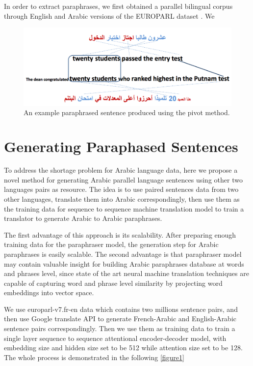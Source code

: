\documentclass[11pt,letterpaper]{article}
\begin{document}
In order to extract paraphrases, we first obtained a parallel bilingual corpus through English and Arabic versions of the EUROPARL dataset \cite{Koehn_europarl}. We 
\begin{figure}
\includegraphics[scale=0.5]{arabic_pivot}
\caption{An example paraphrased sentence produced using the pivot method. }
\end{figure}
\section{Generating Paraphased Sentences}
	To address the shortage problem for Arabic language data, here we propose a novel method for generating Arabic parallel language sentences using other two languages pairs as resource. The idea is to use paired sentences data from two other languages, translate them into Arabic correspondingly, then use them as the  training data for sequence to sequence machine translation model to train a translator  to generate Arabic to Arabic paraphrases.
  
	The first advantage of this approach is its scalability. After preparing enough training data for the paraphraser model, the generation step for Arabic paraphrases is easily scalable. The second advantage is that paraphraser model may contain valuable insight for  building Arabic paraphrases database at  words and phrases level, since state of the art neural machine translation techniques are capable of capturing word and phrase level similarity by projecting word embeddings into vector space.
	
	We use europarl-v7.fr-en data which contains two millions sentence pairs, and then use Google translate API to generate French-Arabic and English-Arabic sentence pairs correspondingly. Then we use them as training data to train a single layer sequence to sequence attentional encoder-decoder model, with embedding size and hidden size set to be 512 while attention size set to be 128. The whole process is demonstrated in the following  \ref{figure1}
\end{document}
